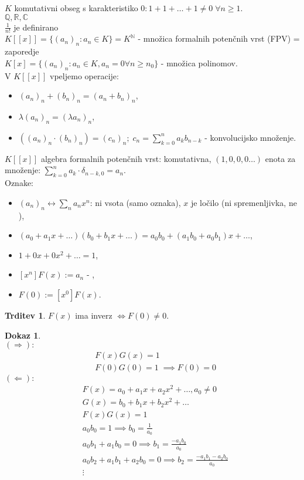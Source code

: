 \documentclass[a4paper, 12pt]{book}
\theoremstyle{definition}
\newtheorem{claim}[counter]{Trditev}
\newtheorem{pro}[counter]{Dokaz}
\theoremstyle{remark}
\newcommand{\N}{\mathbb{N}}
\newcommand{\Q}{\mathbb{Q}}
\newcommand{\R}{\mathbb{R}}
\newcommand{\C}{\mathbb{C}}
\begin{document}
$K$ komutativni obseg s karakteristiko $0: 1 + 1 + \dots + 1 \neq 0 \; \forall n \geq 1$. \\
$\Q, \R, \C$ \\
$\frac{1}{n!}$ je definirano \\
$K[[x]] = \{(a_n)_n: a_n \in K\} = K^{\N}$ - množica formalnih potenčnih vrst (FPV) = zaporedje \\
$K[x] = \{(a_n)_n: a_n \in K, a_n = 0 \forall n \geq n_0\}$ - množica polinomov. \\
V $K[[x]]$ vpeljemo operacije:
\begin{itemize}[label={}]
  \item $(a_n)_n + (b_n)_n = (a_n + b_n)_n$,
  \item $\lambda (a_n)_n = (\lambda a_n)_n$,
  \item $((a_n)_n \cdot (b_n)_n) = (c_n)_n; \; c_n = \sum_{k=0}^{n} a_k b_{n-k}$ - konvolucijsko množenje.
\end{itemize}
$K[[x]]$ algebra formalnih potenčnih vrst: komutativna, $(1,0,0,0 \dots)$ enota za množenje:
$\sum_{k=0}^{n} a_k \cdot \delta_{n-k,0} = a_n$. \\
Oznake:
\begin{itemize}[label={}]
  \item $(a_n)_n \leftrightarrow \sum_n a_n x^n$: ni vsota (samo oznaka), $x$ je ločilo (ni spremenljivka, ne ),
  \item $(a_0 + a_1x + \dots) (b_0 + b_1x + \dots) = a_0 b_0 + (a_1 b_0 + a_0 b_1) x + \dots$,
  \item $1 + 0x + 0x^2 + \dots = 1$,
  \item $[x^n] F(x) := a_n$ - ,
  \item $F(0) := [x^0] F(x)$.
\end{itemize}
\begin{claim}
  $F(x)$ ima inverz $\iff F(0) \neq 0$.
\end{claim}
\begin{pro} \text{} \\
  $(\Longrightarrow):$
  \begin{align*}
    &F(x) G(x) = 1 \\
    &F(0) G(0) = 1\; \implies F(0) = 0
  \end{align*}
  $(\Longleftarrow):$
  \begin{align*}
    &F(x) = a_0 + a_1x + a_2x^2 + \dots, a_0 \neq 0 \\
    &G(x) = b_0 + b_1x + b_2x^2 + \dots \\
    &F(x) G(x) = 1 \\
    &a_0 b_0 = 1 \implies b_0 = \frac{1}{a_0} \\
    &a_0 b_1 + a_1 b_0 = 0 \implies b_1 = \frac{-a_1 b_0}{a_0} \\
    &a_0 b_2 + a_1 b_1 + a_2 b_0 = 0 \implies b_2 = \frac{-a_1 b_1 - a_2 b_0}{a_0} \\
    &\vdots
  \end{align*}
\end{pro}
\end{document}
